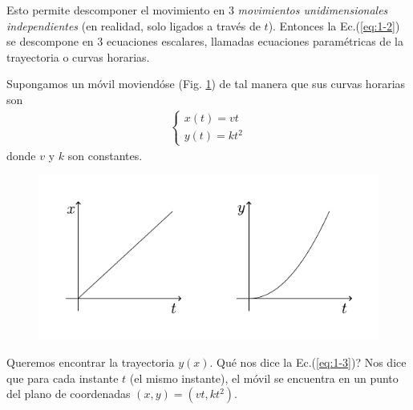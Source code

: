 Esto permite descomponer el movimiento en 3 \textit{movimientos unidimensionales independientes} (en realidad, solo 
ligados a través de $t$). Entonces la Ec.(\ref{eq:1-2}) se descompone en 3 ecuaciones escalares, llamadas ecuaciones 
paramétricas de la trayectoria o curvas horarias.

\begin{example}
Supongamos un móvil moviendóse (Fig. \ref{fig:1-16}) de tal manera que sus curvas horarias son 
\begin{align}
  \begin{cases}
    x(t) = v t  \\ 
    y(t) = k t^2
  \end{cases}
  \label{eq:1-3}
\end{align}
donde $v$ y $k$ son constantes.

\begin{figure}[htbp]
  \centering
  \includegraphics[]{images/f1-16.pdf}
  \caption{}
  \label{fig:1-16}
\end{figure}

Queremos encontrar la trayectoria $y(x)$. \textquestiondown Qué nos dice la Ec.(\ref{eq:1-3})? Nos dice que para cada 
instante $t$ (el mismo instante), el móvil se encuentra en un punto del plano de coordenadas $(x,y) = (vt,kt^2)$.


\end{example}

